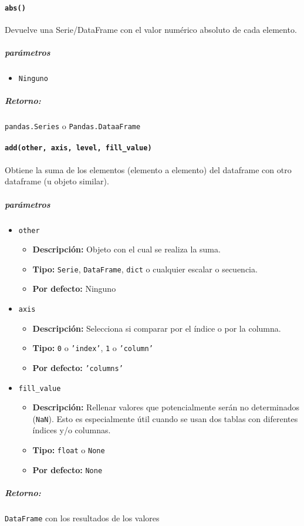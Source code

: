 
\paragraph{\texttt{abs()}} Devuelve una Serie/DataFrame con el valor numérico
absoluto de cada elemento.
\subparagraph{\textbf{parámetros}}
\begin{itemize}
    \item \texttt{Ninguno}
\end{itemize}
\subparagraph{\textbf{Retorno:}} \texttt{pandas.Series} o
\texttt{Pandas.DataaFrame}

\paragraph{\texttt{add(other, axis, level, fill\_value)}} Obtiene la suma de
los elementos (elemento a elemento) del dataframe con otro dataframe (u objeto
similar).
\subparagraph{\textbf{parámetros}}
\begin{itemize}
    \item \texttt{other}
          \begin{itemize}
              \item \textbf{Descripción:} Objeto con el cual se realiza la
                    suma.
              \item \textbf{Tipo:} \texttt{Serie}, \texttt{DataFrame},
                    \texttt{dict} o cualquier escalar o secuencia.
              \item \textbf{Por defecto:} Ninguno
          \end{itemize}
    \item \texttt{axis}
          \begin{itemize}
              \item \textbf{Descripción:} Selecciona si comparar por el índice
                    o por la columna.
              \item \textbf{Tipo:} \texttt{0} o \texttt{'index'}, \texttt{1} o
                    \texttt{'column'}
              \item \textbf{Por defecto:} \texttt{'columns'}
          \end{itemize}
    \item \texttt{fill\_value}
          \begin{itemize}
              \item \textbf{Descripción:} Rellenar valores que potencialmente
                    serán no determinados (\texttt{NaN}). Esto es especialmente útil cuando se usan
                    dos tablas con diferentes índices y/o columnas.
              \item \textbf{Tipo:} \texttt{float} o \texttt{None}
              \item \textbf{Por defecto:} \texttt{None}
          \end{itemize}
\end{itemize}
\subparagraph{Retorno:} \texttt{DataFrame} con los resultados de los valores

